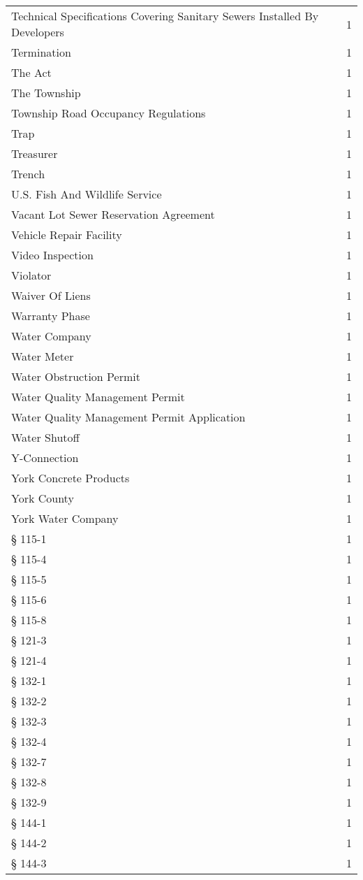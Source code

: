 \begin{longtable}{p{} p{}}
Technical Specifications Covering Sanitary Sewers Installed By Developers & 1 \\
Termination & 1 \\
The Act & 1 \\
The Township & 1 \\
Township Road Occupancy Regulations & 1 \\
Trap & 1 \\
Treasurer & 1 \\
Trench & 1 \\
U.S. Fish And Wildlife Service & 1 \\
Vacant Lot Sewer Reservation Agreement & 1 \\
Vehicle Repair Facility & 1 \\
Video Inspection & 1 \\
Violator & 1 \\
Waiver Of Liens & 1 \\
Warranty Phase & 1 \\
Water Company & 1 \\
Water Meter & 1 \\
Water Obstruction Permit & 1 \\
Water Quality Management Permit & 1 \\
Water Quality Management Permit Application & 1 \\
Water Shutoff & 1 \\
Y-Connection & 1 \\
York Concrete Products & 1 \\
York County & 1 \\
York Water Company & 1 \\
§ 115-1 & 1 \\
§ 115-4 & 1 \\
§ 115-5 & 1 \\
§ 115-6 & 1 \\
§ 115-8 & 1 \\
§ 121-3 & 1 \\
§ 121-4 & 1 \\
§ 132-1 & 1 \\
§ 132-2 & 1 \\
§ 132-3 & 1 \\
§ 132-4 & 1 \\
§ 132-7 & 1 \\
§ 132-8 & 1 \\
§ 132-9 & 1 \\
§ 144-1 & 1 \\
§ 144-2 & 1 \\
§ 144-3 & 1 \\

\end{longtable}
